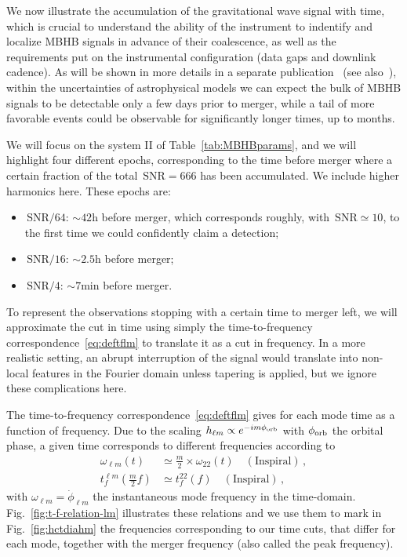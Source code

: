 \documentclass[aps,showpacs,twocolumn,prd,superscriptaddress,nofootinbib]{revtex4-1}
\newcommand{\bsub}{\begin{subequations}}
\newcommand{\esub}{\end{subequations}}
\newcommand{\SNR}{\,\mathrm{SNR}}
\begin{document}
We now illustrate the accumulation of the gravitational wave signal with time, which is crucial to understand the ability of the instrument to indentify and localize MBHB signals in advance of their coalescence, as well as the requirements put on the instrumental configuration (data gaps and downlink cadence). As will be shown in more details in a separate publication~\cite{MarsatBabak20} (see also~\cite{KatzLarson18}), within the uncertainties of astrophysical models we can expect the bulk of MBHB signals to be detectable only a few days prior to merger, while a tail of more favorable events could be observable for significantly longer times, up to months.

We will focus on the system II of Table~\ref{tab:MBHBparams}, and we will highlight four different epochs, corresponding to the time before merger where a certain fraction of the total $\SNR = 666$ has been accumulated. We include higher harmonics here. These epochs are:
\begin{itemize}
	\item $\SNR/64$: $\sim 42\mathrm{h}$ before merger, which corresponds roughly, with $\SNR \simeq 10$, to the first time we could confidently claim a detection;
	\item $\SNR/16$: $\sim 2.5\mathrm{h}$ before merger;
	\item $\SNR/4$: $\sim 7\mathrm{min}$ before merger.
\end{itemize}

To represent the observations stopping with a certain time to merger left, we will approximate the cut in time using simply the time-to-frequency correspondence~\eqref{eq:deftflm} to translate it as a cut in frequency. In a more realistic setting, an abrupt interruption of the signal would translate into non-local features in the Fourier domain unless tapering is applied, but we ignore these complications here.

The time-to-frequency correspondence~\eqref{eq:deftflm} gives for each mode time as a function of frequency. Due to the scaling $h_{\ell m} \propto e^{-i m \phi_{\rm orb}}$ with $\phi_{\rm orb}$ the orbital phase, a given time corresponds to different frequencies according to
\bsub\label{eq:fscalinglm}
\begin{align}
	\omega_{\ell m}(t) &\simeq \frac{m}{2} \times \omega_{22}(t) \quad (\mathrm{Inspiral})\,, \\
	t_{f}^{\ell m} \left( \frac{m}{2} f\right) &\simeq t_{f}^{22} (f) \quad (\mathrm{Inspiral}) \,,
\end{align}
\esub
with $\omega_{\ell m} = \dot{\phi}_{\ell m}$ the instantaneous mode frequency in the time-domain. Fig.~\ref{fig:t-f-relation-lm} illustrates these relations and we use them to mark in Fig.~\ref{fig:hctdiahm} the frequencies corresponding to our time cuts, that differ for each mode, together with the merger frequency (also called the peak frequency).
\end{document}
